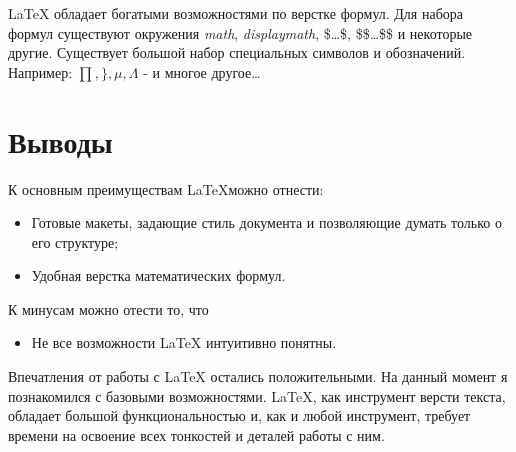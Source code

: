 \documentclass[10pt,a4paper,titlepage]{article}
\begin{document}
\LaTeX{} обладает богатыми возможностями по верстке формул. Для набора формул существуют окружения \textit{math}, \textit{displaymath}, \$\ldots\$, \$\$\ldots\$\$ и некоторые другие. Существует большой набор специальных символов и обозначений. Например: $\prod, \Bigg\}, \mu, \Lambda$ - и многое другое\ldots

\section{Выводы}
К основным преимуществам \LaTeX можно отнести:\\
\begin{itemize}
\item Готовые макеты, задающие стиль документа и позволяющие думать только о его структуре;
\item Удобная верстка математических формул.
\end{itemize}
К минусам можно отести то, что\\
\begin{itemize}
\item Не все возможности \LaTeX{} интуитивно понятны.
\end{itemize}
Впечатления от работы с \LaTeX{ }остались положительными. На данный момент я познакомился с базовыми возможностями. \LaTeX, как инструмент версти текста, обладает большой функциональностью и, как и любой инструмент, требует времени на освоение всех тонкостей и деталей работы с ним.\\
\end{document}
